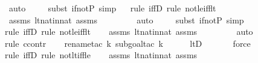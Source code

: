 \begin{isabellebody}
\ auto{\isacharbrackleft}{\kern0pt}{}{\isacharbrackright}{\kern0pt}\isanewline
\ \ \ \ \isamarkupfalse%
{\isacharparenleft}{\kern0pt}subst\ if{\isacharunderscore}{\kern0pt}not{\isacharunderscore}{\kern0pt}P{\isacharcomma}{\kern0pt}\ simp{\isacharparenright}{\kern0pt}\isanewline
\ \ \isamarkupfalse%
{\isacharparenleft}{\kern0pt}rule\ iffD{}{\isacharcomma}{\kern0pt}\ rule\ not{\isacharunderscore}{\kern0pt}le{\isacharunderscore}{\kern0pt}iff{\isacharunderscore}{\kern0pt}lt{\isacharparenright}{\kern0pt}\isanewline
\ \ \isamarkupfalse%
\ assms\ lt{\isacharunderscore}{\kern0pt}nat{\isacharunderscore}{\kern0pt}in{\isacharunderscore}{\kern0pt}nat\ assms\isanewline
\ \ \ \ \ \ \ \isamarkupfalse%
\ auto{\isacharbrackleft}{\kern0pt}{}{\isacharbrackright}{\kern0pt}\isanewline
\ \ \ \ \isamarkupfalse%
{\isacharparenleft}{\kern0pt}subst\ if{\isacharunderscore}{\kern0pt}not{\isacharunderscore}{\kern0pt}P{\isacharcomma}{\kern0pt}\ simp{\isacharparenright}{\kern0pt}\isanewline
\ \ \isamarkupfalse%
{\isacharparenleft}{\kern0pt}rule\ iffD{}{\isacharcomma}{\kern0pt}\ rule\ not{\isacharunderscore}{\kern0pt}le{\isacharunderscore}{\kern0pt}iff{\isacharunderscore}{\kern0pt}lt{\isacharparenright}{\kern0pt}\isanewline
\ \ \isamarkupfalse%
\ assms\ lt{\isacharunderscore}{\kern0pt}nat{\isacharunderscore}{\kern0pt}in{\isacharunderscore}{\kern0pt}nat\ assms\isanewline
\ \ \ \ \ \ \ \isamarkupfalse%
\ auto{\isacharbrackleft}{\kern0pt}{}{\isacharbrackright}{\kern0pt}\isanewline
\ \ \ \isamarkupfalse%
{\isacharparenleft}{\kern0pt}rule\ ccontr{\isacharparenright}{\kern0pt}\isanewline
\ \ \ \isamarkupfalse%
{\isacharparenleft}{\kern0pt}rename{\isacharunderscore}{\kern0pt}tac\ k{\isacharcomma}{\kern0pt}\ subgoal{\isacharunderscore}{\kern0pt}tac\ {\isachardoublequoteopen}k\ {\isasymle}\ {}{\isachardoublequoteclose}{\isacharparenright}{\kern0pt}\isanewline
\ \ \isamarkupfalse%
\ ltD\ \isanewline
\ \ \ \ \isamarkupfalse%
\ force\isanewline
\ \ \isamarkupfalse%
{\isacharparenleft}{\kern0pt}rule\ iffD{}{\isacharcomma}{\kern0pt}\ rule\ not{\isacharunderscore}{\kern0pt}lt{\isacharunderscore}{\kern0pt}iff{\isacharunderscore}{\kern0pt}le{\isacharparenright}{\kern0pt}\isanewline
\ \ \isamarkupfalse%
\ assms\ lt{\isacharunderscore}{\kern0pt}nat{\isacharunderscore}{\kern0pt}in{\isacharunderscore}{\kern0pt}nat\ assms\isanewline

\end{isabellebody}
